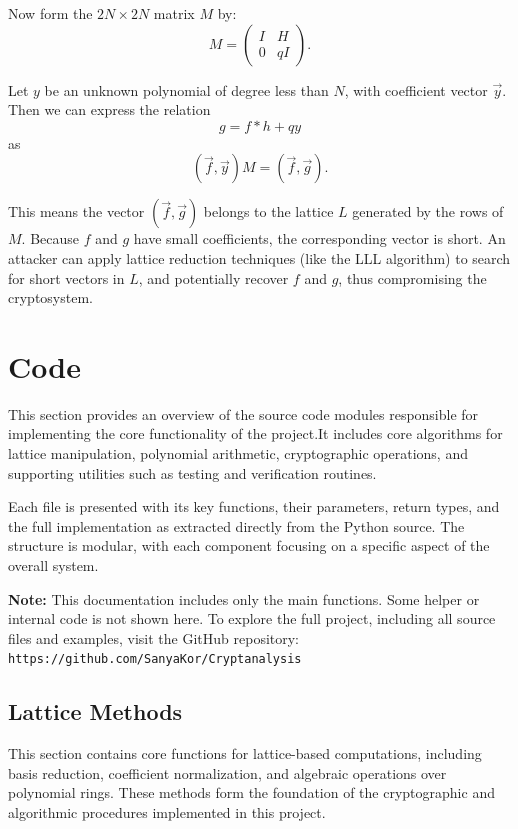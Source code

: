 \documentclass[a4paper,12pt]{article}
\begin{document}
Now form the \( 2N \times 2N \) matrix \( M \) by:
\[
M = 
\begin{pmatrix}
I & H \\
0 & qI
\end{pmatrix}.
\]

Let \( y \) be an unknown polynomial of degree less than \( N \), with coefficient vector \( \vec{y} \). Then we can express the relation
\[
g = f * h + qy
\]
as
\[
(\vec{f}, \vec{y}) M = (\vec{f}, \vec{g}).
\]

This means the vector \( (\vec{f}, \vec{g}) \) belongs to the lattice \( L \) generated by the rows of \( M \). Because \( f \) and \( g \) have small coefficients, the corresponding vector is short. An attacker can apply lattice reduction techniques (like the LLL algorithm) to search for short vectors in \( L \), and potentially recover \( f \) and \( g \), thus compromising the cryptosystem.

\newpage
\section{Code}
This section provides an overview of the source code modules responsible for implementing the core functionality of the project.It includes core algorithms for lattice manipulation, polynomial arithmetic, cryptographic operations,  
and supporting utilities such as testing and verification routines.

Each file is presented with its key functions, their parameters, return types, and the full implementation  
as extracted directly from the Python source. The structure is modular, with each component focusing on  
a specific aspect of the overall system.

\vspace{1em}
\noindent
\textbf{Note:} This documentation includes only the main functions.  
Some helper or internal code is not shown here.  
To explore the full project, including all source files and examples, visit the GitHub repository:  
\texttt{https://github.com/SanyaKor/Cryptanalysis}

\subsection{Lattice Methods}
This section contains core functions for lattice-based computations, including basis reduction,  
coefficient normalization, and algebraic operations over polynomial rings.  
These methods form the foundation of the cryptographic and algorithmic procedures implemented in this project.
\end{document}

